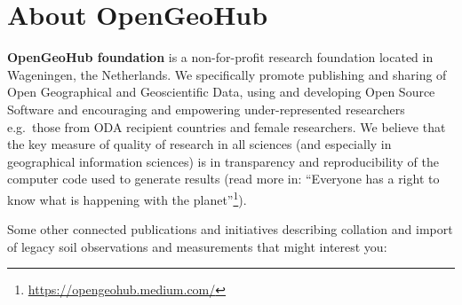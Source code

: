 \documentclass[
  graybox,natbib,nospthms]{svmono}
\renewcommand{\href}[2]{#2 (\url{#1})}
\renewcommand{\href}[2]{#2\footnote{\url{#1}}}
\begin{document}
\hypertarget{about-opengeohub}{%
\section{About OpenGeoHub}\label{about-opengeohub}}

\textbf{OpenGeoHub foundation} is a non-for-profit research foundation
located in Wageningen, the Netherlands. We specifically promote
publishing and sharing of Open Geographical and Geoscientific Data,
using and developing Open Source Software and encouraging and empowering
under-represented researchers e.g.~those from ODA recipient countries
and female researchers. We believe that the key measure of quality of
research in all sciences (and especially in geographical information
sciences) is in transparency and reproducibility of the computer code
used to generate results (read more in: \href{https://opengeohub.medium.com/}{``Everyone has a right to know
what is happening with the planet''}).

Some other connected publications and initiatives describing collation
and import of legacy soil observations and measurements that might interest
you:
\end{document}
